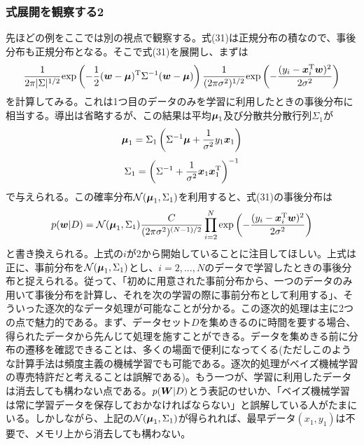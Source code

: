 \documentclass[dvipdfmx, 9pt, a4paper]{jsarticle}
\newcommand{\bm}[1]{{\mbox{\boldmath $#1$}}}
\begin{document}
\subsubsection{式展開を観察する2}
先ほどの例をここでは別の視点で観察する。式(31)は正規分布の積なので、事後分布も正規分布となる。そこで式(31)を展開し、まずは
\begin{equation}
\frac{1}{2\pi|\Sigma|^{1/2}}{\rm exp}\left( -\frac{1}{2}(\bm w-\bm \mu)^{\rm T}
\Sigma^{-1}(\bm w-\bm \mu) \right)\frac{1}{(2\pi \sigma^2)^{1/2}}
{\rm exp}
\left( -\frac{(y_i-\bm x_i^{\rm T}\bm w)^2}{2\sigma^2} \right) \notag
\end{equation}
を計算してみる。これは1つ目のデータのみを学習に利用したときの事後分布に相当する。導出は省略するが、この結果は平均$\bm \mu_1$及び分散共分散行列$\Sigma_1$が
\begin{equation}
\bm \mu_1=\Sigma_1\left(\Sigma^{-1}\bm \mu+\frac{1}{\sigma^2}y_1\bm x_1 \right) \notag
\end{equation}
\begin{equation}
\Sigma_1=\left(\Sigma^{-1}+\frac{1}{\sigma^2}\bm x_1\bm x_1^{\rm T}\right)^{-1} \notag
\end{equation}
で与えられる。この確率分布$\mathcal{N}(\bm \mu_1, \Sigma_1)$を利用すると、式(31)の事後分布は
\begin{equation}
p(\bm w|D)=\mathcal{N}(\bm \mu_1, \Sigma_1)
\frac{C}{(2\pi \sigma^2)^{(N-1)/2}}\prod_{i=2}^N {\rm exp}
\left( -\frac{(y_i-\bm x_i^{\rm T}\bm w)^2}{2\sigma^2} \right) \notag
\end{equation}
と書き換えられる。上式の$i$が2から開始していることに注目してほしい。上式は正に、事前分布を$\mathcal{N}(\bm \mu_1, \Sigma_1)$とし、$i=2,...,N$のデータで学習したときの事後分布と捉えられる。従って、「初めに用意された事前分布から、一つのデータのみ用いて事後分布を計算し、それを次の学習の際に事前分布として利用する」、そういった逐次的なデータ処理が可能なことが分かる。この逐次的処理は主に2つの点で魅力的である。まず、データセット$D$を集めきるのに時間を要する場合、得られたデータから先んじて処理を施すことができる。データを集めきる前に分布の遷移を確認できることは、多くの場面で便利になってくる(ただしこのような計算手法は頻度主義の機械学習でも可能である。逐次的処理がベイズ機械学習の専売特許だと考えることは誤解である)。もう一つが、学習に利用したデータは消去しても構わない点である。$p(\bm W|D)$とう表記のせいか、「ベイズ機械学習は常に学習データを保存しておかなければならない」と誤解している人がたまにいる。しかしながら、上記の$\mathcal{N}(\bm \mu_1, \Sigma_1)$が得られれば、最早データ$(x_1, y_1)$は不要で、メモリ上から消去しても構わない。\par
\end{document}
